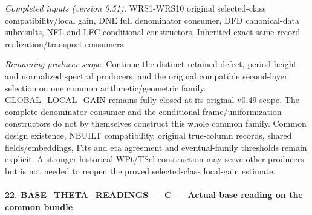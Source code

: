\documentclass[11pt,a4paper]{article}
\numberwithin{equation}{section}
\theoremstyle{remark}\newtheorem{remark}[theorem]{Remark}
\begin{document}
\emph{Completed inputs (version 0.51).} WRS1-WRS10 original selected-class compatibility/local gain, DNE full denominator consumer, DFD canonical-data subresults, NFL and LFC conditional constructors, Inherited exact same-record realization/transport consumers

\emph{Remaining producer scope.} Continue the distinct retained-defect, period-height and normalized spectral producers, and the original compatible second-layer selection on one common arithmetic/geometric family. GLOBAL\_\allowbreak LOCAL\_\allowbreak GAIN remains fully closed at its original v0.49 scope. The complete denominator consumer and the conditional frame/uniformization constructors do not by themselves construct this whole common family. Common design existence, NBUILT compatibility, original true-column records, shared fields/embeddings, Fits and eta agreement and eventual-family thresholds remain explicit. A stronger historical WPt/TSel construction may serve other producers but is not needed to reopen the proved selected-class local-gain estimate.



\paragraph{22. BASE\_\allowbreak THETA\_\allowbreak READINGS — C — Actual base reading on the common bundle}
\end{document}
